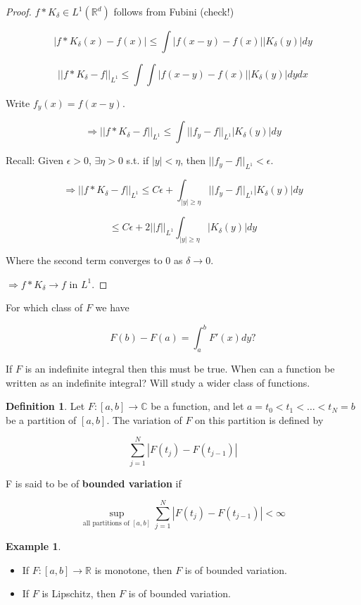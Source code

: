 \documentclass{article}
\theoremstyle{definition}
\newtheorem{ex}{Example}
\newtheorem{dfn}{Definition}
\begin{document}
\begin{proof}
  $f*K_\delta \in L^1(\mathbb{R}^d)$ follows from  Fubini (check!)

  $$|f*K_\delta(x) - f(x)| \leq \int |f(x - y) - f(x)| |K_\delta(y)| dy$$

  $$||f*K_\delta - f||_{L^1} \leq \int \int |f(x - y) - f(x)| |K_\delta(y)|dydx$$

  Write $f_y(x) = f(x - y)$.

  $$\Rightarrow ||f*K_\delta - f||_{L^1} \leq \int ||f_y - f||_{L^1} |K_\delta(y)| dy$$

  Recall: Given $\epsilon > 0$, $\exists \eta > 0$ s.t. if $|y| < \eta$, then $||f_y - f||_{L^1} < \epsilon$.

  $$\Rightarrow ||f*K_\delta - f||_{L^1} \leq C\epsilon + \int_{|y| \geq \eta} ||f_y - f||_{L^1} |K_\delta(y)|dy$$

  $$\leq C \epsilon + 2||f||_{L^1} \int_{|y| \geq \eta} |K_\delta(y)|dy$$

  Where the second term converges to 0 as $\delta \rightarrow 0$.

  $\Rightarrow f*K_\delta \rightarrow f$ in $L^1$. 
\end{proof}

For which class of $F$ we have 

$$F(b) - F(a) = \int_a^b F'(x) dy \text{?}$$

If $F$ is an indefinite integral then this must be true. When can a function be written as an indefinite integral? Will study a wider class of functions. 

\begin{dfn}
  Let $F:[a, b] \rightarrow \mathbb{C}$ be a function, and let $a = t_0 < t_1 < \hdots < t_N = b$ be a partition of $[a, b]$. The variation of $F$ on this partition is defined by 

  $$\sum_{j = 1}^N  |F(t_j) - F(t_{j - 1})|$$

  F is said to be of \textbf{bounded variation} if 

  $$\sup_{\text{all partitions of }[a ,b]} \sum_{j = 1}^N |F(t_j) - F(t_{j - 1})| < \infty $$

\end{dfn}

\begin{ex}
  \begin{itemize}
    \item If $F: [a, b] \rightarrow \mathbb{R}$ is monotone, then $F$ is of bounded variation.

    \item If $F$ is Lipschitz, then $F$ is of bounded variation.
  \end{itemize}
\end{ex}
\end{document}
